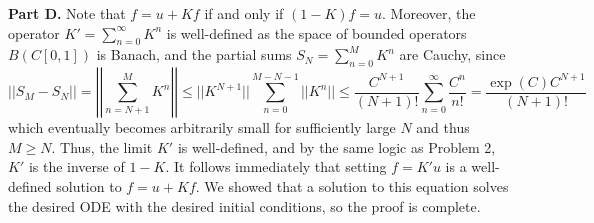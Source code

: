 \documentclass[aps,pra,showpacs,notitlepage,onecolumn,superscriptaddress,nofootinbib]{revtex4-1}
\theoremstyle{definition}
\begin{document}
\noindent \textbf{Part D.} Note that $f = u + Kf$ if and only if $(1 - K) f = u$. Moreover, the operator $K' = \sum_{n = 0}^{\infty} K^n$ is well-defined as the space of bounded operators $B(C[0, 1])$ is Banach, and the
partial sums $S_N = \sum_{n=0}^{M} K^n$ are Cauchy, since
\begin{equation}
  ||S_M - S_N|| = \left|\left| \sum_{n = N+1}^{M} K^n \right|\right| \leq ||K^{N+1}|| \sum_{n=0}^{M-N-1} ||K^n|| \leq \frac{C^{N+1}}{(N+1)!} \sum_{n=0}^{\infty} \frac{C^n}{n!} = \frac{\exp(C) C^{N + 1}}{(N+1)!}
\end{equation}
which eventually becomes arbitrarily small for sufficiently large $N$ and thus $M \geq N$. Thus, the limit $K'$ is well-defined, and by the same logic as Problem 2, $K'$ is the inverse of $1 - K$. It follows immediately that
setting $f = K' u$ is a well-defined solution to $f = u + Kf$. We showed that a solution to this equation solves the desired ODE with the desired initial conditions, so the proof is complete.


\end{document}
